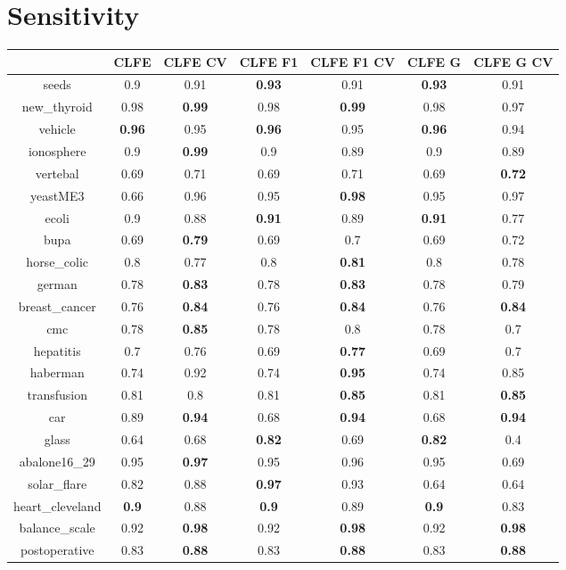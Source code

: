 \documentclass{article}%
\begin{document}
%
\section*{Sensitivity}%
\begin{tabular}{c|cccccc}%
\hline%
&CLFE&CLFE CV&CLFE F1&CLFE F1 CV&CLFE G&CLFE G CV\\%
\hline%
seeds&0.9&0.91&\textbf{0.93}&0.91&\textbf{0.93}&0.91\\%
new\_thyroid&0.98&\textbf{0.99}&0.98&\textbf{0.99}&0.98&0.97\\%
vehicle&\textbf{0.96}&0.95&\textbf{0.96}&0.95&\textbf{0.96}&0.94\\%
ionosphere&0.9&\textbf{0.99}&0.9&0.89&0.9&0.89\\%
vertebal&0.69&0.71&0.69&0.71&0.69&\textbf{0.72}\\%
yeastME3&0.66&0.96&0.95&\textbf{0.98}&0.95&0.97\\%
ecoli&0.9&0.88&\textbf{0.91}&0.89&\textbf{0.91}&0.77\\%
bupa&0.69&\textbf{0.79}&0.69&0.7&0.69&0.72\\%
horse\_colic&0.8&0.77&0.8&\textbf{0.81}&0.8&0.78\\%
german&0.78&\textbf{0.83}&0.78&\textbf{0.83}&0.78&0.79\\%
breast\_cancer&0.76&\textbf{0.84}&0.76&\textbf{0.84}&0.76&\textbf{0.84}\\%
cmc&0.78&\textbf{0.85}&0.78&0.8&0.78&0.7\\%
hepatitis&0.7&0.76&0.69&\textbf{0.77}&0.69&0.7\\%
haberman&0.74&0.92&0.74&\textbf{0.95}&0.74&0.85\\%
transfusion&0.81&0.8&0.81&\textbf{0.85}&0.81&\textbf{0.85}\\%
car&0.89&\textbf{0.94}&0.68&\textbf{0.94}&0.68&\textbf{0.94}\\%
glass&0.64&0.68&\textbf{0.82}&0.69&\textbf{0.82}&0.4\\%
abalone16\_29&0.95&\textbf{0.97}&0.95&0.96&0.95&0.69\\%
solar\_flare&0.82&0.88&\textbf{0.97}&0.93&0.64&0.64\\%
heart\_cleveland&\textbf{0.9}&0.88&\textbf{0.9}&0.89&\textbf{0.9}&0.83\\%
balance\_scale&0.92&\textbf{0.98}&0.92&\textbf{0.98}&0.92&\textbf{0.98}\\%
postoperative&0.83&\textbf{0.88}&0.83&\textbf{0.88}&0.83&\textbf{0.88}\\%
\end{tabular}
\end{document}
